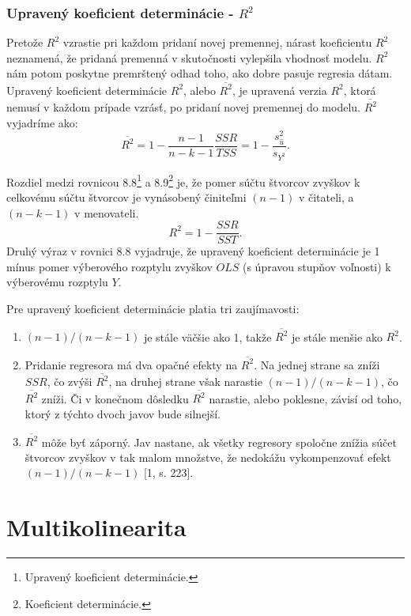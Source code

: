 \documentclass[]{tukediphc}
\begin{document}
\subsubsection{Upravený koeficient determinácie - $R^2$}

Pretože $R^2$ vzrastie pri každom pridaní novej premennej, nárast koeficientu $R^2$ neznamená, že pridaná premenná v skutočnosti vylepšila vhodnosť modelu. $R^2$ nám potom poskytne premrštený odhad toho, ako dobre pasuje regresia dátam. 
Upravený koeficient determinácie $R^2$, alebo $\overline{R^2}$, je upravená verzia $R^2$, ktorá nemusí v každom prípade vzrásť, po pridaní novej premennej do modelu. $\overline{R^2}$ vyjadríme ako:
\begin{equation}
    \overline{R^2} = 1 - \frac{n - 1}{n - k - 1} \frac{SSR}{TSS} = 1 - \frac{s_{\hat{u}}^2}{s_{Y^2}}.
\end{equation}

Rozdiel medzi rovnicou 8.8\footnote{Upravený koeficient determinácie.} a 8.9\footnote{Koeficient determinácie.} je, že pomer súčtu štvorcov zvyškov k celkovému súčtu štvorcov je vynásobený činiteľmi $(n - 1)$ v čitateli, a $(n - k - 1)$ v menovateli.
\begin{equation}
     R^2 = 1 - \frac{SSR}{SST}.
\end{equation}
Druhý výraz v rovnici 8.8 vyjadruje, že upravený koeficient determinácie je 1 mínus pomer výberového rozptylu zvyškov $OLS$ (s úpravou stupňov voľnosti) k výberovému rozptylu $Y$. 

Pre upravený koeficient determinácie platia tri zaujímavosti:
\begin{enumerate}
    \item $(n - 1) / (n - k - 1)$ je stále väčšie ako 1, takže $\overline{R^2}$ je stále menšie ako $R^2$.
    \item Pridanie regresora má dva opačné efekty na $\overline{R^2}$. Na jednej strane sa zníži $SSR$, čo zvýši $\overline{R^2}$, na druhej strane však narastie $(n - 1) / (n - k - 1)$, čo $\overline{R^2}$ zníži. Či v konečnom dôsledku $\overline{R^2}$ narastie, alebo poklesne, závisí od toho, ktorý z týchto dvoch javov bude silnejší.
    \item $\overline{R^2}$ môže byť záporný. Jav nastane, ak všetky regresory spoločne znížia súčet štvorcov zvyškov v tak malom množstve, že nedokážu vykompenzovať efekt $(n - 1) / (n - k - 1)$ [1, s. 223].    
\end{enumerate}

\newpage
\section{Multikolinearita}
\end{document}
